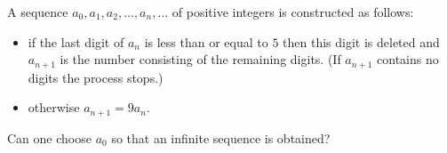 \documentclass[varwidth]{standalone}
\begin{document}
    A sequence $a_0, a_1, a_2, \dots, a_n, \dots$ of positive integers is constructed as follows:
    \begin{itemize}
        \item if the last digit of $a_n$ is less than or equal to $5$ then this digit is deleted and $a_{n + 1}$ is the number consisting of the remaining digits. (If $a_{n + 1}$ contains no digits the process stops.)
        \item otherwise $a_{n + 1} = 9 a_n$.
    \end{itemize}
    Can one choose $a_0$ so that an infinite sequence is obtained?
\end{document}
